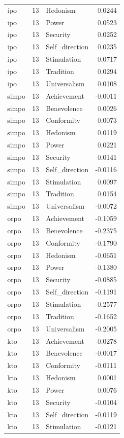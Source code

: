 \begin{tabular}{lrlr}
ipo & 13 & Hedonism & 0.0244 \\
ipo & 13 & Power & 0.0523 \\
ipo & 13 & Security & 0.0252 \\
ipo & 13 & Self\_direction & 0.0235 \\
ipo & 13 & Stimulation & 0.0717 \\
ipo & 13 & Tradition & 0.0294 \\
ipo & 13 & Universalism & 0.0108 \\
simpo & 13 & Achievement & -0.0011 \\
simpo & 13 & Benevolence & 0.0026 \\
simpo & 13 & Conformity & 0.0073 \\
simpo & 13 & Hedonism & 0.0119 \\
simpo & 13 & Power & 0.0221 \\
simpo & 13 & Security & 0.0141 \\
simpo & 13 & Self\_direction & -0.0116 \\
simpo & 13 & Stimulation & 0.0097 \\
simpo & 13 & Tradition & 0.0154 \\
simpo & 13 & Universalism & -0.0072 \\
orpo & 13 & Achievement & -0.1059 \\
orpo & 13 & Benevolence & -0.2375 \\
orpo & 13 & Conformity & -0.1790 \\
orpo & 13 & Hedonism & -0.0651 \\
orpo & 13 & Power & -0.1380 \\
orpo & 13 & Security & -0.0885 \\
orpo & 13 & Self\_direction & -0.1191 \\
orpo & 13 & Stimulation & -0.2577 \\
orpo & 13 & Tradition & -0.1652 \\
orpo & 13 & Universalism & -0.2005 \\
kto & 13 & Achievement & -0.0278 \\
kto & 13 & Benevolence & -0.0017 \\
kto & 13 & Conformity & -0.0111 \\
kto & 13 & Hedonism & 0.0001 \\
kto & 13 & Power & 0.0076 \\
kto & 13 & Security & -0.0104 \\
kto & 13 & Self\_direction & -0.0119 \\
kto & 13 & Stimulation & -0.0121 \\

\end{tabular}
